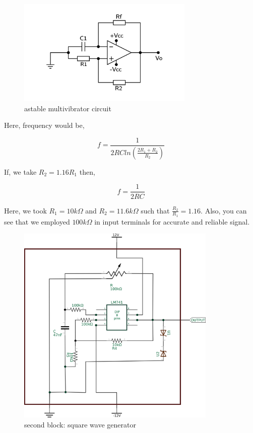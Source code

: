 \documentclass[14pt,a4paper]{extarticle}
\begin{document}
\begin{figure}[H]
    \centering
    \label{square}
    \includegraphics[width=0.75\textwidth]{imgs/square.png}
    \caption{astable multivibrator circuit}
\end{figure}
Here, frequency would be, 

\begin{equation}
\label{eq:orgcda15e0}
  f =\frac{1}{2 RC ln(\frac{2R_{1}+R_{2}}{R_{2}})}
\end{equation}

If, we take \(R_{2}=1.16R_{1}\) then, 

\begin{equation}
\label{eq:org00ce226}
  f =\frac{1}{2RC}
\end{equation}


Here, we took \(R_{1} = 10k\Omega\) and \(R_{2} = 11.6k\Omega\) such that \(\frac{R_{2}}{R_{1}}=1.16\). Also, you can see that we employed \(100k\Omega\) in input terminals for accurate and reliable signal.

\begin{figure}[H]
    \centering
    \label{squarereal}
    \includegraphics[width=0.85\textwidth]{imgs/squarereal.png}
    \caption{second block: square wave generator}
\end{figure}
\end{document}

